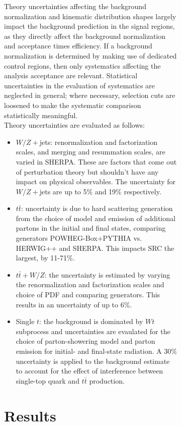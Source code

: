 \begin{figure}[htbp]
\begin{center}
\begin{figure}[htbp]
\begin{center}
{{{Theory uncertainties affecting the background normalization and kinematic distribution shapes largely impact the background prediction in the signal regions, as they directly affect the background normalization and acceptance times efficiency. If a background normalization is determined by making use of dedicated control regions, then only systematics affecting the analysis acceptance are relevant. Statistical uncertainties in the evaluation of systematics are neglected in general; where necessary, selection cuts are loosened to make the systematic comparison statistically meaningful. \\ %

Theory uncertainties are evaluated as follows:
\begin{itemize}
	\item $W/Z+$jets: renormalization and factorization scales, and merging and resummation scales, are varied in SHERPA.  These are factors that come out of perturbation theory but shouldn't have any impact on physical observables.  The uncertainty for $W/Z+$jets are up to 5\% and 19\% respectively.
	\item $t\bar{t}$: uncertainty is due to hard scattering generation from the choice of model and emission of additional partons in the initial and final states, comparing generators POWHEG-Box+PYTHIA vs. HERWIG++ and SHERPA.  This impacts SRC the largest, by 11-71\%.
	\item $t\bar{t}+W/Z$: the uncertainty is estimated by varying the renormalization and factorization scales and choice of PDF and comparing generators.  This results in an uncertainty of up to 6\%.
	\item Single $t$: the background is dominated by $Wt$ subprocess and uncertainties are evaulated for the choice of parton-showering model and parton emission for initial- and final-state radiation.  A 30\% uncertainty is applied to the background estimate to account for the effect of interference between single-top quark and $t\bar{t}$ production.
\end{itemize}




\section{Results}

}}}
\end{center}
\end{figure}
\end{center}
\end{figure}
